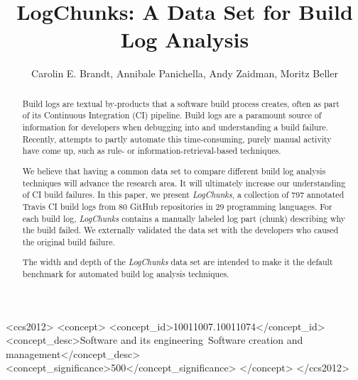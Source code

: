\documentclass[sigconf]{acmart}
\newcommand{\logchunks}{\emph{LogChunks}\xspace}
\begin{document}
\title{LogChunks: A Data Set for Build Log Analysis}

\author{Carolin E. Brandt, Annibale Panichella, Andy Zaidman, Moritz Beller}

\renewcommand{\shortauthors}{Brandt, et al.}

\begin{abstract}
Build logs are textual by-products that a software build process
creates, often as part of its Continuous Integration (CI)
pipeline. Build logs are a paramount source of information for
developers when debugging into and understanding a build
failure. Recently, attempts to partly automate this time-consuming,
purely manual activity have come up, such as rule- or
information-retrieval-based techniques.

We believe that having a common data set to compare
different build log analysis techniques will advance the research
area. It will ultimately increase our understanding of CI build
failures. In this paper, we present \logchunks, a collection of 797
annotated Travis CI build logs from 80 GitHub repositories in 29
programming languages. For each build log, \logchunks contains a
manually labeled log part (chunk) describing why the build failed. We
externally validated the data set with the developers who caused the
original build failure.

The width and depth of the \logchunks data set are intended to
make it the default benchmark for automated build log analysis
techniques.
\end{abstract}

\begin{CCSXML}
<ccs2012>
<concept>
<concept_id>10011007.10011074</concept_id>
<concept_desc>Software and its engineering~Software creation and management</concept_desc>
<concept_significance>500</concept_significance>
</concept>
</ccs2012>
\end{CCSXML}
\end{document}
